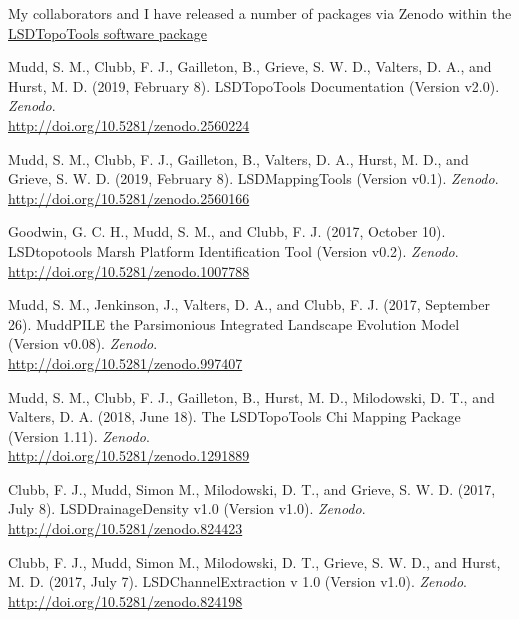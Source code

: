 \documentclass[10pt, a4paper]{article}
\newcommand{\years}[1]{\marginnote{\scriptsize #1}}
\begin{document}
\years{Zenodo}My collaborators and I have released a number of packages via Zenodo within the \href{https://zenodo.org/search?page=1&size=20&q=lsdtopotools}{LSDTopoTools software package}\par
Mudd, S. M., Clubb, F. J., Gailleton, B., Grieve, S. W. D., Valters, D. A., and Hurst, M. D. (2019, February 8). LSDTopoTools Documentation (Version v2.0). \textit{Zenodo}.\\ \href{http://doi.org/10.5281/zenodo.2560224}{http://doi.org/10.5281/zenodo.2560224}\par

Mudd, S. M., Clubb, F. J., Gailleton, B., Valters, D. A., Hurst, M. D., and Grieve, S. W. D. (2019, February 8). LSDMappingTools (Version v0.1). \textit{Zenodo}.\\ \href{http://doi.org/10.5281/zenodo.2560166}{http://doi.org/10.5281/zenodo.2560166}\par

Goodwin, G. C. H., Mudd, S. M., and Clubb, F. J. (2017, October 10). LSDtopotools Marsh Platform Identification Tool (Version v0.2). \textit{Zenodo}.\\ \href{http://doi.org/10.5281/zenodo.1007788}{http://doi.org/10.5281/zenodo.1007788}\par

Mudd, S. M., Jenkinson, J., Valters, D. A., and Clubb, F. J. (2017, September 26). MuddPILE the Parsimonious Integrated Landscape Evolution Model (Version v0.08). \textit{Zenodo}.\\ \href{http://doi.org/10.5281/zenodo.997407}{http://doi.org/10.5281/zenodo.997407}\par

Mudd, S. M., Clubb, F. J., Gailleton, B., Hurst, M. D., Milodowski, D. T., and Valters, D. A. (2018, June 18). The LSDTopoTools Chi Mapping Package (Version 1.11). \textit{Zenodo}.\\ \href{http://doi.org/10.5281/zenodo.1291889}{http://doi.org/10.5281/zenodo.1291889}\par

Clubb, F. J., Mudd, Simon M., Milodowski, D. T., and Grieve, S. W. D. (2017, July 8). LSDDrainageDensity v1.0 (Version v1.0). \textit{Zenodo}.\\ \href{http://doi.org/10.5281/zenodo.824423}{http://doi.org/10.5281/zenodo.824423}\

Clubb, F. J., Mudd, Simon M., Milodowski, D. T., Grieve, S. W. D., and Hurst, M. D. (2017, July 7). LSDChannelExtraction v 1.0 (Version v1.0). \textit{Zenodo}.\\ \href{http://doi.org/10.5281/zenodo.824198}{http://doi.org/10.5281/zenodo.824198}\par
\end{document}
